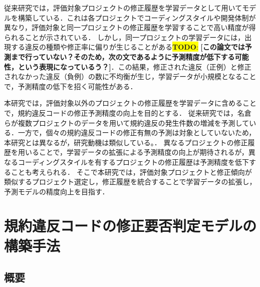 \documentclass[submit]{ipsj}
\newcommand{\todo}[1]{\colorbox{yellow}{{\bf TODO}:}{\color{red} {\textbf{[#1]}}}}
\begin{document}
従来研究では，評価対象プロジェクトの修正履歴を学習データとして用いてモデルを構築している．これは各プロジェクトでコーディングスタイルや開発体制が異なり，評価対象と同一プロジェクトの修正履歴を学習することで高い精度が得られることが示されている．
しかし，同一プロジェクトの学習データには，出現する違反の種類や修正率に偏りが生じることがある\cite{Panichella}\todo{この論文では予測まで行っていない？そのため，次の文であるように予測精度が低下する可能性，という表現になっているう？}．この結果，修正された違反（正例）と修正されなかった違反（負例）の数に不均衡が生じ，学習データが小規模となることで，予測精度の低下を招く可能性がある．

本研究では，評価対象以外のプロジェクトの修正履歴を学習データに含めることで，規約違反コードの修正予測精度の向上を目的とする．
従来研究では，名倉らが複数プロジェクトのデータを用いて規約違反の発生件数の増減を予測している．一方で，個々の規約違反コードの修正有無の予測は対象としていないため，本研究とは異なるが，研究動機は類似している。\cite{nagura}．
異なるプロジェクトの修正履歴を用いることで，学習データの拡張による予測精度の向上が期待されるが，異なるコーディングスタイルを有するプロジェクトの修正履歴は予測精度を低下することも考えられる．
そこで本研究では，評価対象プロジェクトと修正傾向が類似するプロジェクト選定し，修正履歴を統合することで学習データの拡張し，予測モデルの精度向上を目指す．




\section{規約違反コードの修正要否判定モデルの構築手法}\label{chap:approach}

\subsection{概要}
\end{document}
